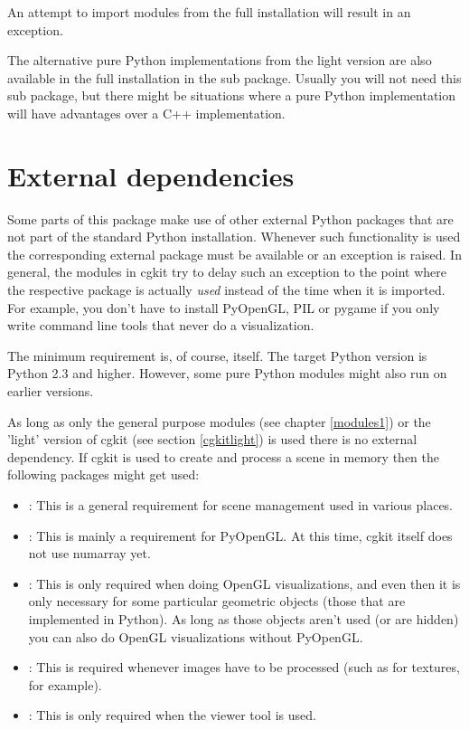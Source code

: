 An attempt to import modules from the full installation will result
in an  exception.

The alternative pure Python implementations from the light version
are also available in the full installation in the 
sub package. Usually you will not need this sub package, but there
might be situations where a pure Python implementation will have advantages
over a C++ implementation.


\section{External dependencies}
\label{externaldeps}

Some parts of this package make use of other external Python packages that
are not part of the standard Python installation. Whenever such functionality
is used the corresponding external package must be available or an exception
is raised. In general, the modules in cgkit try to delay such an exception
to the point where the respective package is actually {\em used} instead
of the time when it is imported. For example, you don't have to install
PyOpenGL, PIL or pygame if you only write command line tools that never
do a visualization.

The minimum requirement is, of course,
 itself. The target Python
version is Python 2.3 and higher. However, some pure Python modules might also
run on earlier versions.

As long as only the general purpose modules (see chapter
\ref{modules1}) or the 'light' version of cgkit (see section
\ref{cgkitlight}) is used there is no external dependency.  If cgkit
is used to create and process a scene in memory then the following
packages might get used:

\begin{itemize}
\item {}: This is a general requirement for scene management used in various places.
\item {}: This is mainly a requirement for PyOpenGL. At this time, cgkit itself does not use numarray yet.
\item {}: This is only 
required when doing OpenGL visualizations, and even then it is only necessary
for some particular geometric objects (those that are implemented in Python).
As long as those objects aren't used (or are hidden) you can also do OpenGL
visualizations without PyOpenGL.
\item {}: This is required whenever images have to be processed (such as for textures, for example).
\item {}: This is only required when the viewer tool is used.
\end{itemize}

